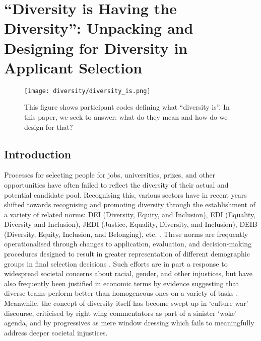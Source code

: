 

\chapter{\label{ch:diversity}``Diversity is Having the Diversity'': Unpacking and Designing for Diversity in Applicant Selection}

\minitoc

\begin{figure}
    \texttt{[image: diversity/diversity\_is.png]}
    \caption{This figure shows participant codes defining what ``diversity is''. In this paper, we seek to answer: what do they mean and how do we design for that?}
    \label{fig:diversity_is_teaser}
\end{figure}
  
\section{Introduction}\label{sec:divintro}
Processes for selecting people for jobs, universities, prizes, and other opportunities have often failed to reflect the diversity of their actual and potential candidate pool. Recognising this, various sectors have in recent years shifted towards recognising and promoting diversity through the establishment of a variety of related norms: DEI (Diversity, Equity, and Inclusion), EDI (Equality, Diversity and Inclusion), JEDI (Justice, Equality, Diversity, and Inclusion), DEIB (Diversity, Equity, Inclusion, and Belonging), etc. \cite{pinkett2023data,hsieh2019allocation,minkin2023diversity}. These norms are frequently operationalised through changes to application, evaluation, and decision-making procedures designed to result in greater representation of different demographic groups in final selection decisions \cite{pinkett2023data}. Such efforts are in part a response to widespread societal concerns about racial, gender, and other injustices, but have also frequently been justified in economic terms by evidence suggesting that diverse teams perform better than homogeneous ones on a variety of tasks \cite{deming2017growing,page_diversity_2017,noray2023systemic}. Meanwhile, the concept of diversity itself has become swept up in `culture war' discourse, criticised by right wing commentators as part of a sinister `woke' agenda, and by progressives as mere window dressing which fails to meaningfully address deeper societal injustices. 

